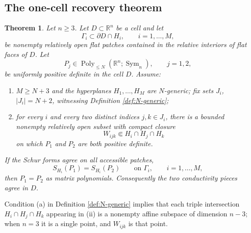 \documentclass[10pt,a4paper]{amsart}
\newtheorem{theorem}{Theorem}[section]
\newcommand{\R}{\mathbb R}
\newcommand{\Sym}{\operatorname{Sym}}
\begin{document}
\subsection{The one-cell recovery theorem}

\begin{theorem}
\label{thm:flat-cell-recovery}
Let \(n\ge3\).  Let \(D\subset\R^n\) be a cell and let
\begin{equation}
  \Gamma_i\subset \partial D\cap H_i,
  \qquad i=1,\ldots,M,
\end{equation}
be nonempty relatively open flat patches contained in the relative interiors of
flat faces of \(D\).  Let
\begin{equation}
  P_j\in\operatorname{Poly}_{\le N}(\R^n;\Sym_n),
  \qquad j=1,2,
\end{equation}
be uniformly positive definite in the cell \(D\).  Assume:
\begin{enumerate}[label=(\roman*)]
  \item \(M\ge N+3\) and the hyperplanes \(H_1,\ldots,H_M\) are
  \(N\)-generic; fix sets \(J_i\), \(|J_i|=N+2\), witnessing Definition
  \ref{def:N-generic};
  \item for every \(i\) and every two distinct indices \(j,k\in J_i\), there is
  a bounded nonempty relatively open subset with compact closure
  \begin{equation}
    W_{ijk}\Subset H_i\cap H_j\cap H_k
    \label{eq:common-triple-region}
  \end{equation}
  on which \(P_1\) and \(P_2\) are both positive definite.
\end{enumerate}
If the Schur forms agree on all accessible patches,
\begin{equation}
  S_{H_i}(P_1)=S_{H_i}(P_2)
  \qquad\text{on }\Gamma_i,
  \qquad i=1,\ldots,M,
  \label{eq:flat-cell-face-data-hypothesis}
\end{equation}
then \(P_1=P_2\) as matrix polynomials.  Consequently the two conductivity
pieces agree in \(D\).
\end{theorem}

Condition (a) in Definition \ref{def:N-generic} implies that each triple
intersection
\(H_i\cap H_j\cap H_k\) appearing in (ii) is a nonempty affine subspace of
dimension \(n-3\); when \(n=3\) it is a single point, and \(W_{ijk}\) is that
point.
\end{document}
